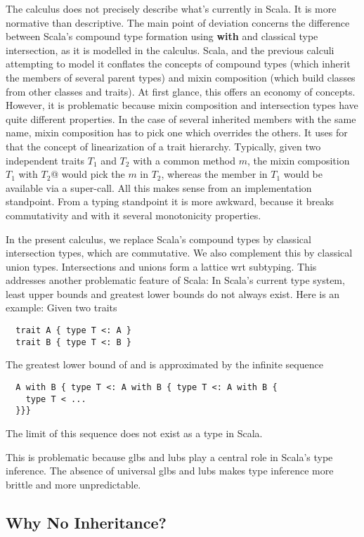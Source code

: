 \documentclass[9pt]{sigplanconf}
\begin{document}
The calculus does not precisely describe what's currently in Scala. It
is more normative than descriptive. The main point of deviation
concerns the difference between Scala's compound type formation using
{\bf with} and classical type intersection, as it is modelled in the
calculus. Scala, and the previous calculi attempting to model it
conflates the concepts of compound types (which inherit the members of
several parent types) and mixin composition (which build classes from
other classes and traits). At first glance, this offers an economy of
concepts. However, it is problematic because mixin composition and
intersection types have quite different properties. In the case of
several inherited members with the same name, mixin composition has to
pick one which overrides the others. It uses for that the concept of
linearization of a trait hierarchy. Typically, given two independent
traits $T_1$ and $T_2$ with a common method $m$, the mixin composition
\code@$T_1$ with $T_2$@ would pick the $m$ in $T_2$, whereas the member in
$T_1$ would be available via a super-call. All this makes sense from
an implementation standpoint. From a typing standpoint it is more
awkward, because it breaks commutativity and with it several
monotonicity properties.

In the present calculus, we replace Scala's compound types by
classical intersection types, which are commutative. We also
complement this by classical union types. Intersections and unions
form a lattice wrt subtyping. This addresses another problematic
feature of Scala: In Scala's current type system, least upper bounds
and greatest lower bounds do not always exist. Here is an example:
Given two traits
\begin{lstlisting}
  trait A { type T <: A }
  trait B { type T <: B }
\end{lstlisting}
The greatest lower bound of \code@A@ and \code@B@ is approximated by the
infinite sequence
\begin{lstlisting}
  A with B { type T <: A with B { type T <: A with B {
    type T < ...
  }}}
\end{lstlisting}
The limit of this sequence does not exist as a type in Scala.

This is problematic because glbs and lubs play a central role in
Scala's type inference. The absence of universal glbs and lubs makes
type inference more brittle and more unpredictable.

\subsection*{Why No Inheritance?}
\end{document}
